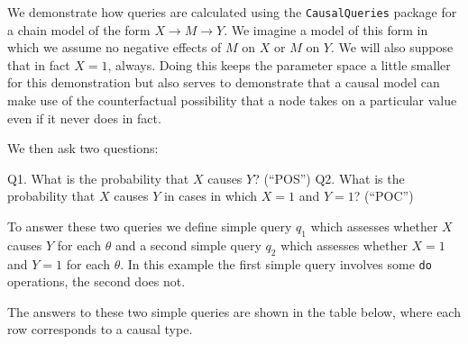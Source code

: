 \documentclass[
  12pt,
]{book}
\newenvironment{Shaded}{\begin{snugshade}}{\end{snugshade}}
\newcommand{\AttributeTok}[1]{\textcolor[rgb]{0.00,0.34,0.68}{#1}}
\newcommand{\FunctionTok}[1]{\textcolor[rgb]{0.39,0.29,0.61}{#1}}
\newcommand{\NormalTok}[1]{\textcolor[rgb]{0.12,0.11,0.11}{#1}}
\newcommand{\OtherTok}[1]{\textcolor[rgb]{0.00,0.43,0.16}{#1}}
\newcommand{\SpecialCharTok}[1]{\textcolor[rgb]{0.24,0.68,0.91}{#1}}
\newcommand{\StringTok}[1]{\textcolor[rgb]{0.75,0.01,0.01}{#1}}
\begin{document}
We demonstrate how queries are calculated using the \texttt{CausalQueries} package for a chain model of the form \(X \rightarrow M \rightarrow Y\). We imagine a model of this form in which we assume no negative effects of \(M\) on \(X\) or \(M\) on \(Y\). We will also suppose that in fact \(X=1\), always. Doing this keeps the parameter space a little smaller for this demonstration but also serves to demonstrate that a causal model can make use of the counterfactual possibility that a node takes on a particular value even if it never does in fact.

We then ask two questions:

Q1. What is the probability that \(X\) causes \(Y\)? (``POS'')
Q2. What is the probability that \(X\) causes \(Y\) in cases in which \(X=1\) and \(Y=1\)? (``POC'')

To answer these two queries we define simple query \(q_1\) which assesses whether \(X\) causes \(Y\) for each \(\theta\) and a second simple query \(q_2\) which assesses whether \(X=1\) and \(Y=1\) for each \(\theta\). In this example the first simple query involves some \texttt{do} operations, the second does not.

The answers to these two simple queries are shown in the table below, where each row corresponds to a causal type.

\begin{Shaded}
\end{Shaded}
\end{document}
